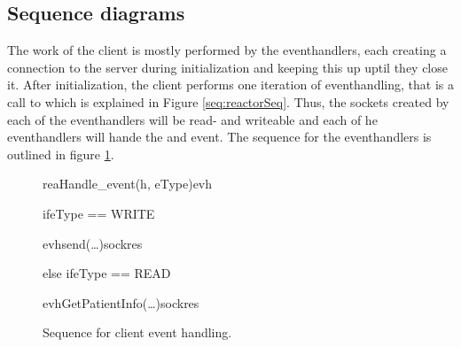 \documentclass[Main]{subfiles}
\begin{document}
\subsection{Sequence diagrams}

The work of the client is mostly performed by the eventhandlers, each creating a connection to the server during initialization and keeping this up uptil they close it.
After initialization, the client performs one iteration of eventhandling, that is a call to  which is explained in Figure \ref{seq:reactorSeq}. 
Thus, the sockets created by each of the eventhandlers will be read- and writeable and each of he eventhandlers will hande the  and  event. 
The sequence for the eventhandlers is outlined in figure \ref{fig:clientEventHandler}.

\begin{figure}
\begin {sequencediagram}

	\begin{messcall}{rea}{Handle\_event(h, eType)}{evh}

		\begin{sdblock}{if}{eType == WRITE}
			\begin{call}{evh}{send(\dots)}{sock}{res}
			\end{call}

		\end{sdblock}


		\begin{sdblock}{else if}{eType == READ}
			\begin{call}{evh}{GetPatientInfo(\dots)}{sock}{res}
			\end{call}

		\end{sdblock}


	\end{messcall}
\end{sequencediagram}

\caption{Sequence for client event handling.}
\label{fig:clientEventHandler}
\end{figure}
\end{document}
